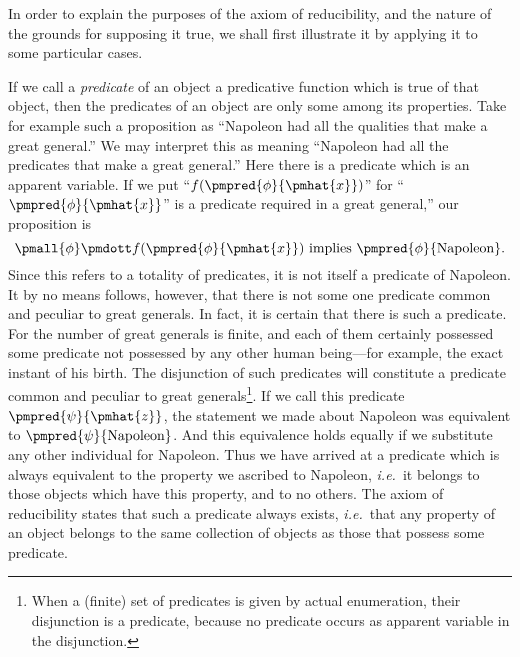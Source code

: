 \documentclass[letterpaper,12pt,openany,leqno]{book}
\begin{document}
In order to explain the purposes of the axiom of reducibility, and the nature of the grounds for supposing it true, we shall first illustrate it by applying it to some particular cases.

If we call a \textit{predicate} of an object a predicative function which is true of that object, then the predicates of an object are only some among its properties. Take for example such a proposition as ``Napoleon had all the qualities that make a great general.'' We may interpret this as meaning ``Napoleon had all the predicates that make a great general.'' Here there is a predicate which is an apparent variable. If we put ``$f(\pmpred{\phi}{\pmhat{x}})$'' for ``$\pmpred{\phi}{\pmhat{x}}$'' is a predicate required in a great general,'' our proposition is 
\[
	\pmall{\phi}\pmdott f(\pmpred{\phi}{\pmhat{x}}) \text{ implies } \pmpred{\phi}{\text{Napoleon}}.
\]
Since this refers to a totality of predicates, it is not itself a predicate of Napoleon. It by no means follows, however, that there is not some one predicate common and peculiar to great generals. In fact, it is certain that there is such a predicate. For the number of great generals is finite, and each of them certainly possessed some predicate not possessed by any other human being---for example, the exact instant of his birth. The disjunction of such predicates will constitute a predicate common and peculiar to great generals\footnote{When a (finite) set of predicates is given by actual enumeration, their disjunction is a predicate, because no predicate occurs as apparent variable in the disjunction.}. If we call this predicate $\pmpred{\psi}{\pmhat{z}}$, the statement we made about Napoleon was equivalent to $\pmpred{\psi}{\text{Napoleon}}$. And this equivalence holds equally if we substitute any other individual for Napoleon. Thus we have arrived at a predicate which is always equivalent to the property we ascribed to Napoleon, \textit{i.e.}\ it belongs to those objects which have this property, and to no others. The axiom of reducibility states that such a predicate always exists, \textit{i.e.}\ that any property of an object belongs to the same collection of objects as those that possess some predicate.
\end{document}
